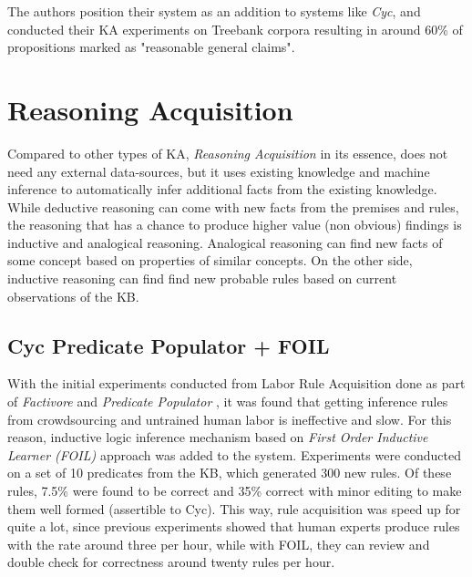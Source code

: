 The authors position their system as an addition to systems like \emph{Cyc}, and
conducted their KA experiments on Treebank corpora resulting in around 60\% of
propositions marked as "reasonable general claims"\parencite{Schubert2003}. 

\section{Reasoning Acquisition}
\label{section:r:reasoningacq}
Compared to other types of KA, \emph{Reasoning Acquisition} in its essence,
does not need any external data-sources, but it uses existing knowledge and
machine inference to automatically infer additional facts from the existing
knowledge. While deductive reasoning can come with new facts from the premises 
and rules, the reasoning that has a chance to produce higher value (non obvious)
findings is inductive and analogical reasoning. Analogical reasoning can find
new facts of some concept based on properties of similar concepts. On the other
side, inductive reasoning can find find new probable rules based on current 
observations of the KB.

\subsection {Cyc Predicate Populator + FOIL}
With the initial experiments conducted from Labor Rule Acquisition done as part
of \emph{Factivore} and \emph{Predicate Populator} \parencite{Witbrock2005}, it 
was found that getting inference rules from crowdsourcing and untrained
human labor is ineffective and slow. For this reason, inductive logic 
inference mechanism based on \emph{First Order Inductive Learner (FOIL)}
approach
\parencite{Quinlan1995} was added to the system. Experiments were conducted on
a set of 10 predicates from the KB, which generated 300 new rules. Of these
rules, 7.5\% were found to be correct and 35\% correct with minor editing to
make them well formed (assertible to Cyc). This way, rule acquisition was speed
up for quite a lot, since previous experiments showed that human experts produce
rules with the rate around three per hour, while with FOIL, they can review
and double check for correctness around twenty rules per hour.

